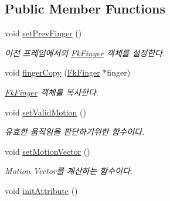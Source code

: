 \subsection*{Public Member Functions}
\begin{DoxyCompactItemize}
\item 
\hypertarget{class_fk_finger_a100b1b832419610ab2cef58c768640ce}{}void \hyperlink{class_fk_finger_a100b1b832419610ab2cef58c768640ce}{set\+Prev\+Finger} ()\label{class_fk_finger_a100b1b832419610ab2cef58c768640ce}

\begin{DoxyCompactList}\small\item\em 이전 프레임에서의 \hyperlink{class_fk_finger}{Fk\+Finger} 객체를 설정한다. \end{DoxyCompactList}\item 
\hypertarget{class_fk_finger_ad4d199d41e59e9c5cf78adbf9ddfb8b6}{}void \hyperlink{class_fk_finger_ad4d199d41e59e9c5cf78adbf9ddfb8b6}{finger\+Copy} (\hyperlink{class_fk_finger}{Fk\+Finger} $\ast$finger)\label{class_fk_finger_ad4d199d41e59e9c5cf78adbf9ddfb8b6}

\begin{DoxyCompactList}\small\item\em \hyperlink{class_fk_finger}{Fk\+Finger} 객체를 복사한다. \end{DoxyCompactList}\item 
\hypertarget{class_fk_finger_aafd95f6eedd4552ca9e8b15a50bb69b1}{}void \hyperlink{class_fk_finger_aafd95f6eedd4552ca9e8b15a50bb69b1}{set\+Valid\+Motion} ()\label{class_fk_finger_aafd95f6eedd4552ca9e8b15a50bb69b1}

\begin{DoxyCompactList}\small\item\em 유효한 움직임을 판단하기위한 함수이다. \end{DoxyCompactList}\item 
\hypertarget{class_fk_finger_ad44afd0486962efc0d1e65753881fc49}{}void \hyperlink{class_fk_finger_ad44afd0486962efc0d1e65753881fc49}{set\+Motion\+Vector} ()\label{class_fk_finger_ad44afd0486962efc0d1e65753881fc49}

\begin{DoxyCompactList}\small\item\em Motion Vector를 계산하는 함수이다. \end{DoxyCompactList}\item 
\hypertarget{class_fk_finger_ae9b1ed3b7d93a7000adaf274c5995785}{}void \hyperlink{class_fk_finger_ae9b1ed3b7d93a7000adaf274c5995785}{init\+Attribute} ()\label{class_fk_finger_ae9b1ed3b7d93a7000adaf274c5995785}


\end{DoxyCompactItemize}
